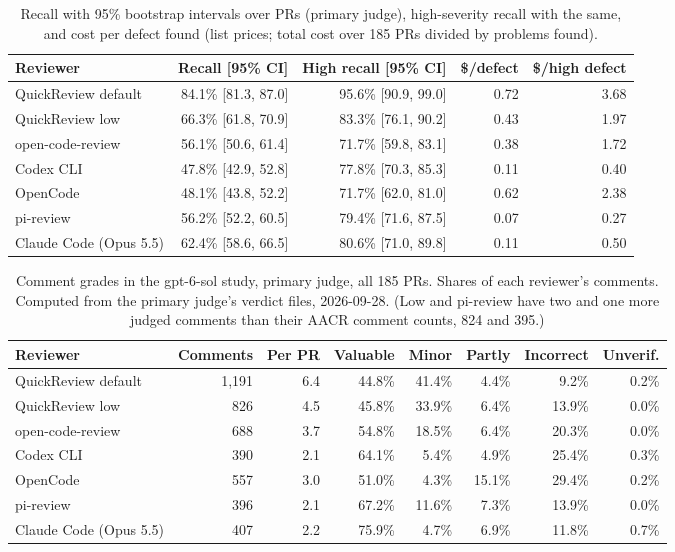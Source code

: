 \documentclass[11pt,a4paper]{article}
\newcommand{\qcr}{QuickReview}
\begin{document}
\begin{table}[tbp]
  \centering
  \small
  \caption{Recall with 95\% bootstrap intervals over PRs (primary judge),
  high-severity recall with the same, and cost per defect found (list
  prices; total cost over 185 PRs divided by problems found).}
  \label{tab:ci-sol}
  \begin{tabular}{lrrrr}
    \toprule
    Reviewer & Recall [95\% CI] & High recall [95\% CI] & \$/defect & \$/high defect \\
    \midrule
    \qcr{} default & 84.1\% [81.3, 87.0] & 95.6\% [90.9, 99.0] & 0.72 & 3.68 \\
    \qcr{} low & 66.3\% [61.8, 70.9] & 83.3\% [76.1, 90.2] & 0.43 & 1.97 \\
    open-code-review & 56.1\% [50.6, 61.4] & 71.7\% [59.8, 83.1] & 0.38 & 1.72 \\
    Codex CLI & 47.8\% [42.9, 52.8] & 77.8\% [70.3, 85.3] & 0.11 & 0.40 \\
    OpenCode & 48.1\% [43.8, 52.2] & 71.7\% [62.0, 81.0] & 0.62 & 2.38 \\
    pi-review & 56.2\% [52.2, 60.5] & 79.4\% [71.6, 87.5] & 0.07 & 0.27 \\
    Claude Code (Opus 5.5) & 62.4\% [58.6, 66.5] & 80.6\% [71.0, 89.8] & 0.11 & 0.50 \\
    \bottomrule
  \end{tabular}
\end{table}

\begin{table}[tbp]
  \centering
  \small
  \caption{Comment grades in the gpt-6-sol study, primary judge, all 185 PRs. Shares of each
  reviewer's comments. Computed from the primary judge's verdict files,
  2026-09-28. (Low and pi-review have two and one more judged comments
  than their AACR comment counts, 824 and 395.)}
  \label{tab:grades-sol}
  \begin{tabular}{lrrrrrrr}
    \toprule
    Reviewer & Comments & Per PR & Valuable & Minor & Partly & Incorrect & Unverif. \\
    \midrule
    \qcr{} default & 1{,}191 & 6.4 & 44.8\% & 41.4\% & 4.4\% & 9.2\% & 0.2\% \\
    \qcr{} low & 826 & 4.5 & 45.8\% & 33.9\% & 6.4\% & 13.9\% & 0.0\% \\
    open-code-review & 688 & 3.7 & 54.8\% & 18.5\% & 6.4\% & 20.3\% & 0.0\% \\
    Codex CLI & 390 & 2.1 & 64.1\% & 5.4\% & 4.9\% & 25.4\% & 0.3\% \\
    OpenCode & 557 & 3.0 & 51.0\% & 4.3\% & 15.1\% & 29.4\% & 0.2\% \\
    pi-review & 396 & 2.1 & 67.2\% & 11.6\% & 7.3\% & 13.9\% & 0.0\% \\
    Claude Code (Opus 5.5) & 407 & 2.2 & 75.9\% & 4.7\% & 6.9\% & 11.8\% & 0.7\% \\
    \bottomrule
  \end{tabular}
\end{table}
\end{document}
